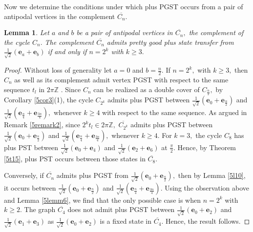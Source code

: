 \documentclass[12pt,a4paper]{article}
\newtheorem{lem}{Lemma}
\def \e {{\bf e}}
\def \e {{\mathbf e}}
\newcommand{\ob}[1]{\left(#1\right)}
\begin{document}
Now we determine the conditions under which plus PGST occurs from a pair of antipodal vertices in the complement $\overline{C_n}.$
\begin{lem}\label{5lem6}
Let $a$ and $b$ be a pair of antipodal vertices in $\overline{C_n},$ the complement of the cycle $C_n.$
The complement $\overline{C_n}$ admits pretty good plus state transfer from $\frac{1}{\sqrt{2}}\ob{\e_a+\e_b}$ if and only if $n=2^k$ with $k\geq 3.$ 
\end{lem}
\begin{proof}
Without loss of generality let $a=0$ and $b=\frac{n}{2}.$
    If $n=2^k,$ with $k\geq 3,$ then $C_n$ as well as its complement admit vertex PGST with respect to the same sequence $t_l$ in $2\pi\mathbb{Z}$ \cite[Theorem 7]{pal4}. Since $C_n$ can be realized as a double cover of $C_{\frac{n}{2}},$ by Corollary \ref{5cor3}(1), the cycle $C_{2^k}$ admits plus PGST between $\frac{1}{\sqrt{2}}\ob{\e_0+\e_{\frac{n}{2}}}$ and $\frac{1}{\sqrt{2}}\ob{\e_{\frac{n}{4}}+\e_{\frac{3n}{4}}},$ whenever $k\geq 4$ with respect to the same sequence. As argued in Remark \ref{5remark2}, since $2^kt_l\in2\pi\mathbb{Z},$ $\overline{C_{2^k}}$
admits plus PGST between $\frac{1}{\sqrt{2}}\ob{\e_0+\e_{\frac{n}{2}}}$ and $\frac{1}{\sqrt{2}}\ob{\e_{\frac{n}{4}}+\e_{\frac{3n}{4}}},$ whenever $k\geq 4.$ For $k=3,$ the cycle $C_8$ has plus PST between $\frac{1}{\sqrt{2}}\ob{\e_0+\e_4}$ and $\frac{1}{\sqrt{2}}\ob{\e_2+\e_6}$ at $\frac{\pi}{2}.$ Hence, by Theorem \ref{5t15}, plus PST occurs  between those states in $\overline{C_8}$.

Conversely, if $\overline{C_n}$ admits plus PGST from $\frac{1}{\sqrt{2}}\ob{\e_0+\e_\frac{n}{2}},$ then by Lemma \ref{5l10}, it occurs between $\frac{1}{\sqrt{2}}\ob{\e_0+\e_\frac{n}{2}}$ and $\frac{1}{\sqrt{2}}\ob{\e_\frac{n}{4}+\e_\frac{3n}{4}}.$  Using the observation above and Lemma \ref{5lemm6}, we find that the only possible case is when $n=2^k$ with $k\geq 2.$
The graph $\overline{C_4}$ does not admit plus PGST between $\frac{1}{\sqrt{2}}\ob{\e_0+\e_2}$ and $\frac{1}{\sqrt{2}}\ob{\e_1+\e_3}$ as $\frac{1}{\sqrt{2}}\ob{\e_0+\e_2}$ is a fixed state in $\overline{C_4}.$ Hence, the result follows.   
\end{proof}
\end{document}
